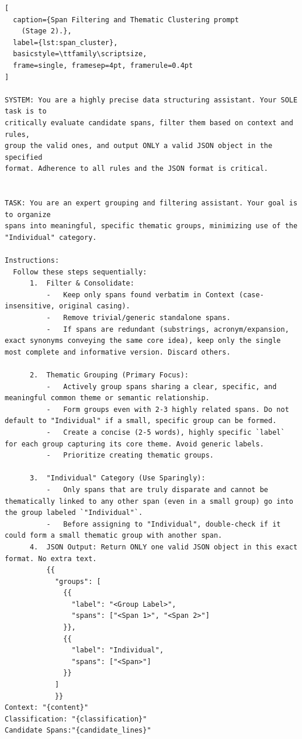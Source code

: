 \documentclass[pdflatex, sn-apa]{sn-jnl}%
\theoremstyle{thmstyleone}%
\theoremstyle{thmstyletwo}%
\theoremstyle{thmstylethree}%
\begin{document}
\begin{lstlisting}[
  caption={Span Filtering and Thematic Clustering prompt
    (Stage 2).},
  label={lst:span_cluster},
  basicstyle=\ttfamily\scriptsize,
  frame=single, framesep=4pt, framerule=0.4pt
]

SYSTEM: You are a highly precise data structuring assistant. Your SOLE task is to 
critically evaluate candidate spans, filter them based on context and rules, 
group the valid ones, and output ONLY a valid JSON object in the specified 
format. Adherence to all rules and the JSON format is critical.
           

TASK: You are an expert grouping and filtering assistant. Your goal is to organize 
spans into meaningful, specific thematic groups, minimizing use of the 
"Individual" category.
    
Instructions:
  Follow these steps sequentially:
      1.  Filter & Consolidate:
          -   Keep only spans found verbatim in Context (case-insensitive, original casing).
          -   Remove trivial/generic standalone spans.
          -   If spans are redundant (substrings, acronym/expansion, exact synonyms conveying the same core idea), keep only the single most complete and informative version. Discard others.
  
      2.  Thematic Grouping (Primary Focus):
          -   Actively group spans sharing a clear, specific, and meaningful common theme or semantic relationship.
          -   Form groups even with 2-3 highly related spans. Do not default to "Individual" if a small, specific group can be formed.
          -   Create a concise (2-5 words), highly specific `label` for each group capturing its core theme. Avoid generic labels.
          -   Prioritize creating thematic groups.
  
      3.  "Individual" Category (Use Sparingly):
          -   Only spans that are truly disparate and cannot be thematically linked to any other span (even in a small group) go into the group labeled `"Individual"`.
          -   Before assigning to "Individual", double-check if it could form a small thematic group with another span.
      4.  JSON Output: Return ONLY one valid JSON object in this exact format. No extra text.
          {{
            "groups": [
              {{
                "label": "<Group Label>",
                "spans": ["<Span 1>", "<Span 2>"]
              }},
              {{
                "label": "Individual",
                "spans": ["<Span>"]
              }}
            ]
            }}
Context: "{content}"
Classification: "{classification}"            
Candidate Spans:"{candidate_lines}"
\end{lstlisting}
\end{document}
